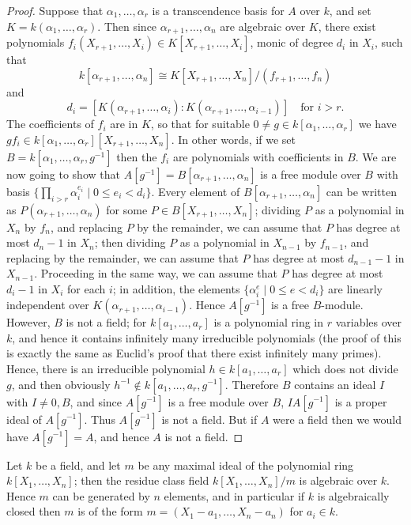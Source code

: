 \begin{proof}
Suppose that $\alpha_1, \ldots, \alpha_r$ is a transcendence basis for $A$ over $k$, and set
$K = k(\alpha_1, \ldots, \alpha_r)$. Then since $\alpha_{r+1}, \ldots, \alpha_n$ are algebraic over $K$, there exist
polynomials $f_i(X_{r+1}, \ldots, X_i) \in K[X_{r+1}, \ldots, X_i]$, monic of degree $d_i$ in $X_i$, such that
\[
  k[\alpha_{r+1}, \ldots, \alpha_n] \cong K[X_{r+1}, \ldots, X_n]/(f_{r+1}, \ldots, f_n)
\]
and
\[
  d_i = [K(\alpha_{r+1}, \ldots, \alpha_i) : K(\alpha_{r+1}, \ldots, \alpha_{i-1})] \quad \text{for } i > r.
\]
The coefficients of $f_i$ are in $K$, so that for suitable $0 \neq g \in k[\alpha_1, \ldots, \alpha_r]$ we
have $gf_i \in k[\alpha_1, \ldots, \alpha_r][X_{r+1}, \ldots, X_n]$. In other words, if we set $B =
k[\alpha_1, \ldots, \alpha_r, g^{-1}]$ then the $f_i$ are polynomials with coefficients in $B$. We
are now going to show that $A[g^{-1}] = B[\alpha_{r+1}, \ldots, \alpha_n]$ is a free module over
$B$ with basis $\{\prod_{i>r} \alpha_i^{e_i} \mid 0 \le e_i < d_i\}$. Every element of $B[\alpha_{r+1}, \ldots, \alpha_n]$ can
be written as $P(\alpha_{r+1}, \ldots, \alpha_n)$ for some $P \in B[X_{r+1}, \ldots, X_n]$; dividing $P$ as a
polynomial in $X_n$ by $f_n$, and replacing $P$ by the remainder, we can assume
that $P$ has degree at most $d_n - 1$ in $X_n$; then dividing $P$ as a polynomial
in $X_{n-1}$ by $f_{n-1}$, and replacing by the remainder, we can assume that $P$
has degree at most $d_{n-1} - 1$ in $X_{n-1}$. Proceeding in the same way, we
can assume that $P$ has degree at most $d_i - 1$ in $X_i$ for each $i$; in addition,
the elements $\{\alpha_i^e \mid 0 \le e < d_i\}$ are linearly independent over $K(\alpha_{r+1}, \ldots, \alpha_{i-1})$. Hence $A[g^{-1}]$ is a free $B$-module. However, $B$ is not a field; for
$k[a_1, \ldots, a_r]$ is a polynomial ring in $r$ variables over $k$, and hence it contains
infinitely many irreducible polynomials (the proof of this is exactly the
same as Euclid's proof that there exist infinitely many primes). Hence,
there is an irreducible polynomial $h \in k[a_1, \ldots, a_r]$ which does not divide
$g$, and then obviously $h^{-1} \notin k[a_1, \ldots, a_r, g^{-1}]$. Therefore $B$ contains an
ideal $I$ with $I \neq 0, B$, and since $A[g^{-1}]$ is a free module over $B$, $IA[g^{-1}]$
is a proper ideal of $A[g^{-1}]$. Thus $A[g^{-1}]$ is not a field. But if $A$ were a
field then we would have $A[g^{-1}] = A$, and hence $A$ is not a field.
\end{proof}

\begin{theorem}\label{thm:5.3}
Let $k$ be a field, and let $m$ be any maximal ideal of the
polynomial ring $k[X_1, \ldots, X_n]$; then the residue class field $k[X_1, \ldots, X_n]/m$
is algebraic over $k$. Hence $m$ can be generated by $n$ elements, and in
particular if $k$ is algebraically closed then $m$ is of the form $m =
(X_1 - a_1, \ldots, X_n - a_n)$ for $a_i \in k$.
\end{theorem}

